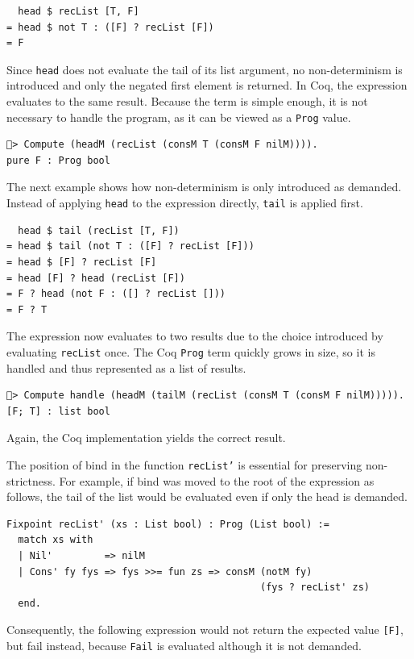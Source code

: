 \documentclass[a4paper, 11pt, fleqn, twoside, abstract=on]{scrreprt}
\newcommand{\hinl}[1]{\texttt{#1}}
\newcommand{\cinl}[1]{\texttt{#1}}
\begin{document}
\begin{verbatim}
  head $ recList [T, F]
= head $ not T : ([F] ? recList [F])
= F
\end{verbatim}
\noindent
Since \hinl{head} does not evaluate the tail of its list argument, no non-determinism is introduced and only the negated first element is returned.
In Coq, the expression evaluates to the same result.
Because the term is simple enough, it is not necessary to handle the program, as it can be viewed as a \cinl{Prog} value.

\begin{verbatim}
🐔> Compute (headM (recList (consM T (consM F nilM)))).
pure F : Prog bool
\end{verbatim}

The next example shows how non-determinism is only introduced as demanded.
Instead of applying \hinl{head} to the expression directly, \hinl{tail} is applied first.

\begin{verbatim}
  head $ tail (recList [T, F])
= head $ tail (not T : ([F] ? recList [F]))
= head $ [F] ? recList [F]
= head [F] ? head (recList [F])
= F ? head (not F : ([] ? recList []))
= F ? T
\end{verbatim}
\noindent
The expression now evaluates to two results due to the choice introduced by evaluating \hinl{recList} once.
The Coq \cinl{Prog} term quickly grows in size, so it is handled and thus represented as a list of results.

\begin{verbatim}
🐔> Compute handle (headM (tailM (recList (consM T (consM F nilM))))).
[F; T] : list bool
\end{verbatim}
\noindent
Again, the Coq implementation yields the correct result.

The position of bind in the function \cinl{recList'} is essential for preserving non-strictness.
For example, if bind was moved to the root of the expression as follows, the tail of the list would be evaluated even if only the head is demanded.

\begin{verbatim}
Fixpoint recList' (xs : List bool) : Prog (List bool) :=
  match xs with
  | Nil'         => nilM
  | Cons' fy fys => fys >>= fun zs => consM (notM fy)
                                            (fys ? recList' zs)
  end.
\end{verbatim}
\noindent
Consequently, the following expression would not return the expected value \cinl{[F]}, but fail instead, because \cinl{Fail} is evaluated although it is not demanded.
\end{document}
